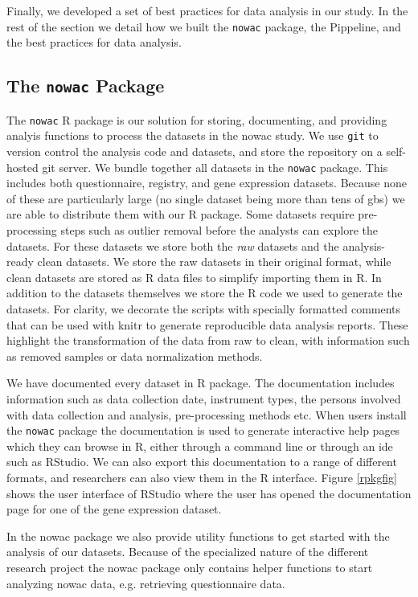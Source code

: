 Finally, we developed a set of best practices for data analysis in our study. In
the rest of the section we detail how we built the \texttt{nowac} package, the
Pippeline, and the best practices for data analysis. 

\subsection{The \texttt{nowac} Package} 
The \texttt{nowac} R package is our solution for storing, documenting, and
providing analyis functions to process the datasets in the \gls{nowac} study. We
use \texttt{git} to version control the analysis code and datasets, and store
the repository on a self-hosted git server.  We bundle together all datasets in
the \texttt{nowac} package. This includes both questionnaire, registry, and gene
expression datasets. Because none of these are particularly large (no single
dataset being more than tens of \glspl{gb}) we are able to distribute them with
our R package. Some datasets require pre-processing steps such as outlier
removal before the analysts can explore the datasets. For these datasets we
store both the \emph{raw} datasets and the analysis-ready clean datasets. We
store the raw datasets in their original format, while clean datasets are stored
as R data files to simplify importing them in R. In addition to the datasets
themselves we store the R code we used to generate the datasets. For clarity, we
decorate the scripts with specially formatted comments that can be used with
knitr\cite{xie2016dynamic} to generate reproducible data analysis reports. These
highlight the transformation of the data from raw to clean, with information
such as removed samples or data normalization methods. 

We have documented every dataset in R package. The documentation includes
information such as data collection date, instrument types, the persons involved
with data collection and analysis, pre-processing methods etc.  When users
install the \texttt{nowac} package the documentation is used to generate
interactive help pages which they can browse in R, either through a command line
or through an \gls{ide} such as RStudio.  We can also export this documentation
to a range of different formats, and researchers can also view them in the R
interface. Figure \ref{rpkgfig} shows the user interface of RStudio where the
user has opened the documentation page for one of the gene expression dataset. 

In the \gls{nowac} package we also provide utility functions to get started with
the analysis of our datasets. Because of the specialized nature of the different
research project the \gls{nowac} package only contains helper functions to start
analyzing \gls{nowac} data, e.g. retrieving questionnaire data. 

